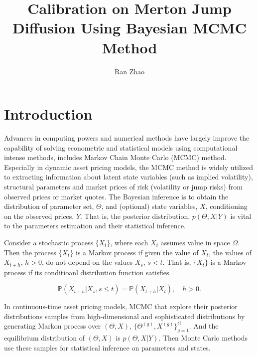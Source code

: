 \documentclass[11pt,reqno,final]{amsart}
\title{Calibration on Merton Jump Diffusion Using Bayesian MCMC Method}
\author{Ran Zhao}
\begin{document}
\begin{abstract}

\end{abstract}

\maketitle
%
%
%
\section{Introduction}
Advances in computing powers and numerical methods have largely improve the capability of solving econometric and statistical models using computational intense methods, includes Markov Chain Monte Carlo (MCMC) method. Especially in dynamic asset pricing models, the MCMC method is widely utilized to extracting information about latent state variables (such as implied volatility), structural parameters and market prices of risk (volatility or jump risks) from observed prices or market quotes. The Bayesian inference is to obtain the distribution of parameter set, $\Theta$, and (optional) state variables, $X$, conditioning on the observed prices, $Y$. That is, the posterior distribution, $p(\Theta, X|Y)$ is vital to the parameters estimation and their statistical inference.

Consider a stochastic process $\{X_t\}$, where each $X_t$ assumes value in space $\Omega$. Then the process $\{X_t\}$ is a Markov process if given the value of $X_t$, the values of $X_{t+h}$, $h>0$, do not depend on the values $X_s$, $s<t$. That is, $\{X_t\}$ is a Markov process if its conditioanl distribution function satisfies

$$
\mathbb{P}(X_{t+h}|X_s, s \leq t) = \mathbb{P}(X_{t+h}|X_t), \quad h>0.
$$

In continuous-time asset pricing models, MCMC that explore their posterior distributions samples from high-dimensional and sophisticated distributions by generating Markon process over $(\Theta,X)$, $\{\Theta^{(g)}, X^{(g)}\}_{g=1}^{G}$. And the equilibrium distribution of $(\Theta,X)$ is $p(\Theta, X|Y)$. Then Monte Carlo methods use these samples for statistical inference on parameters and states.
\end{document}

